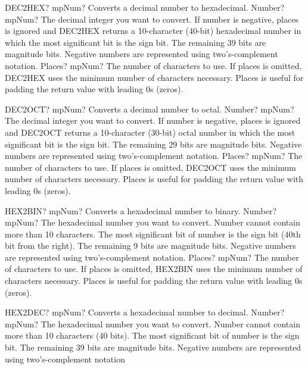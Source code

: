 \documentclass[12pt,a4paper,openany]{book}
\begin{document}
\begin{mpFunctionsExtract}
\mpWorksheetFunctionTwoNotImplemented
{DEC2HEX? mpNum? Converts a decimal number to hexadecimal.}
{Number? mpNum? The decimal integer you want to convert. If number is negative, places is ignored and DEC2HEX returns a 10-character (40-bit) hexadecimal number in which the most significant bit is the sign bit. The remaining 39 bits are magnitude bits. Negative numbers are represented using two's-complement notation.}
{Places? mpNum? The number of characters to use. If places is omitted, DEC2HEX uses the minimum number of characters necessary. Places is useful for padding the return value with leading 0s (zeros).}
\end{mpFunctionsExtract}

\begin{mpFunctionsExtract}
\mpWorksheetFunctionTwoNotImplemented
{DEC2OCT? mpNum? Converts a decimal number to octal.}
{Number? mpNum? The decimal integer you want to convert. If number is negative, places is ignored and DEC2OCT returns a 10-character (30-bit) octal number in which the most significant bit is the sign bit. The remaining 29 bits are magnitude bits. Negative numbers are represented using two's-complement notation.}
{Places? mpNum? The number of characters to use. If places is omitted, DEC2OCT uses the minimum number of characters necessary. Places is useful for padding the return value with leading 0s (zeros).}
\end{mpFunctionsExtract}

\begin{mpFunctionsExtract}
\mpWorksheetFunctionTwoNotImplemented
{HEX2BIN? mpNum? Converts a  hexadecimal number to binary.}
{Number? mpNum? The hexadecimal number you want to convert. Number cannot contain more than 10 characters. The most significant bit of number is the sign bit (40th bit from the right). The remaining 9 bits are magnitude bits. Negative numbers are represented using two's-complement notation.}
{Places? mpNum? The number of characters to use. If places is omitted, HEX2BIN uses the minimum number of characters necessary. Places is useful for padding the return value with leading 0s (zeros).}
\end{mpFunctionsExtract}

\begin{mpFunctionsExtract}
\mpWorksheetFunctionOneNotImplemented
{HEX2DEC? mpNum? Converts a hexadecimal number to decimal.}
{Number? mpNum? The hexadecimal number you want to convert. Number cannot contain more than 10 characters (40 bits). The most significant bit of number is the sign bit. The remaining 39 bits are magnitude bits. Negative numbers are represented using two's-complement notation}
\end{mpFunctionsExtract}
\end{document}
